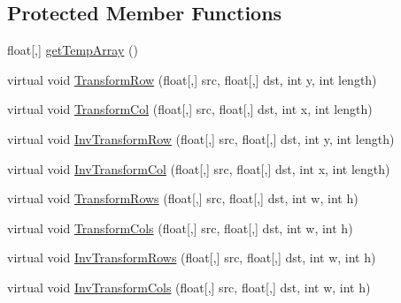 \subsection*{\-Protected \-Member \-Functions}
\begin{DoxyCompactItemize}
\item 
float\mbox{[},\mbox{]} \hyperlink{class_turbo_wavelets_1_1_wavelet2_d_a3dc6269869eb9c864f615e42d7822153}{get\-Temp\-Array} ()
\item 
virtual void \hyperlink{class_turbo_wavelets_1_1_wavelet2_d_af0339475762d327f9d8ec019079cdc28}{\-Transform\-Row} (float\mbox{[},\mbox{]} src, float\mbox{[},\mbox{]} dst, int y, int length)
\item 
virtual void \hyperlink{class_turbo_wavelets_1_1_wavelet2_d_a6a6c334fb499d248b72215001ff5e9d4}{\-Transform\-Col} (float\mbox{[},\mbox{]} src, float\mbox{[},\mbox{]} dst, int x, int length)
\item 
virtual void \hyperlink{class_turbo_wavelets_1_1_wavelet2_d_ac0b65a648f05436b54aa4d925812e1d5}{\-Inv\-Transform\-Row} (float\mbox{[},\mbox{]} src, float\mbox{[},\mbox{]} dst, int y, int length)
\item 
virtual void \hyperlink{class_turbo_wavelets_1_1_wavelet2_d_a9897e5e3f830ab7ea106e6bcf367fa07}{\-Inv\-Transform\-Col} (float\mbox{[},\mbox{]} src, float\mbox{[},\mbox{]} dst, int x, int length)
\item 
virtual void \hyperlink{class_turbo_wavelets_1_1_wavelet2_d_a95e430713dc5e27ebf7b254d1346777e}{\-Transform\-Rows} (float\mbox{[},\mbox{]} src, float\mbox{[},\mbox{]} dst, int w, int h)
\item 
virtual void \hyperlink{class_turbo_wavelets_1_1_wavelet2_d_a7aae90825e937ebb7822c2daa976d22a}{\-Transform\-Cols} (float\mbox{[},\mbox{]} src, float\mbox{[},\mbox{]} dst, int w, int h)
\item 
virtual void \hyperlink{class_turbo_wavelets_1_1_wavelet2_d_a9109cf50d757e7cda895ce0965134f76}{\-Inv\-Transform\-Rows} (float\mbox{[},\mbox{]} src, float\mbox{[},\mbox{]} dst, int w, int h)
\item 
virtual void \hyperlink{class_turbo_wavelets_1_1_wavelet2_d_a08ab1e9de65415589726214fa8b45ae2}{\-Inv\-Transform\-Cols} (float\mbox{[},\mbox{]} src, float\mbox{[},\mbox{]} dst, int w, int h)
\end{DoxyCompactItemize}
